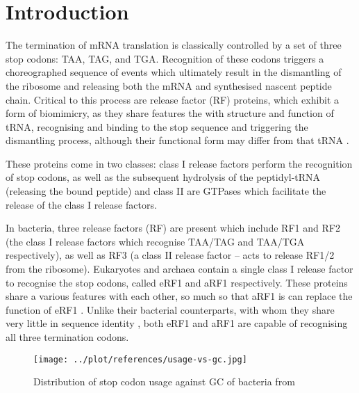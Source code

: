 \documentclass[../main.tex]{subfile}
\begin{document}
 \section{Introduction}
    The termination of mRNA translation is classically controlled by a set of three stop codons: TAA, TAG, and TGA. Recognition of these codons triggers a choreographed sequence of events which ultimately result in the dismantling of the ribosome and releasing both the mRNA and synthesised nascent peptide chain.
    Critical to this process are release factor (RF) proteins, which exhibit a form of biomimicry, as they share features the with structure and function of tRNA, recognising and binding to the stop sequence and triggering the dismantling process, although their functional form may differ from that tRNA \autocite{Nakamura2003}.

    These proteins come in two classes: class I release factors perform the recognition of stop codons, as well as the subsequent hydrolysis of the peptidyl-tRNA (releasing the bound peptide) and class II are GTPases which facilitate the release of the class I release factors.

    In bacteria, three release factors (RF) are present which include RF1 and RF2 (the class I release factors which recognise TAA/TAG and TAA/TGA respectively), as well as RF3 (a class II release factor -- acts to release RF1/2 from the ribosome).
    Eukaryotes and archaea contain a single class I release factor to recognise the stop codons, called eRF1 and aRF1 respectively. These proteins share a various features with each other, so much so that aRF1 is can replace the function of eRF1 \autocite{Dontsova2000}. Unlike their bacterial counterparts, with whom they share very little in sequence identity \autocite{Inagaki2000}, both eRF1 and aRF1 are capable of recognising all three termination codons.

    \begin{wrapfigure}{r}{7.5cm}
        \centering
        \texttt{[image: ../plot/references/usage-vs-gc.jpg]}
        \caption{Distribution of stop codon usage against GC of bacteria from \mancite\cite{Korkmaz2014}}
        \label{fig:intro/codon-gc}
    \end{wrapfigure}
\end{document}
